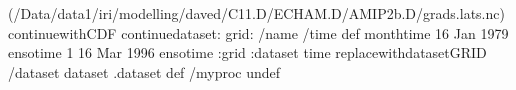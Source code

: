 \begin{ingrid}
(/Data/data1/iri/modelling/daved/C11.D/ECHAM.D/AMIP2b.D/grads.lats.nc) continuewithCDF
continuedataset: 
grid:
/name /time def
monthtime
16 Jan 1979 ensotime
1
16 Mar 1996 ensotime
:grid
:dataset
time replacewithdatasetGRID
/dataset dataset .dataset def
/myproc undef
\end{ingrid}
